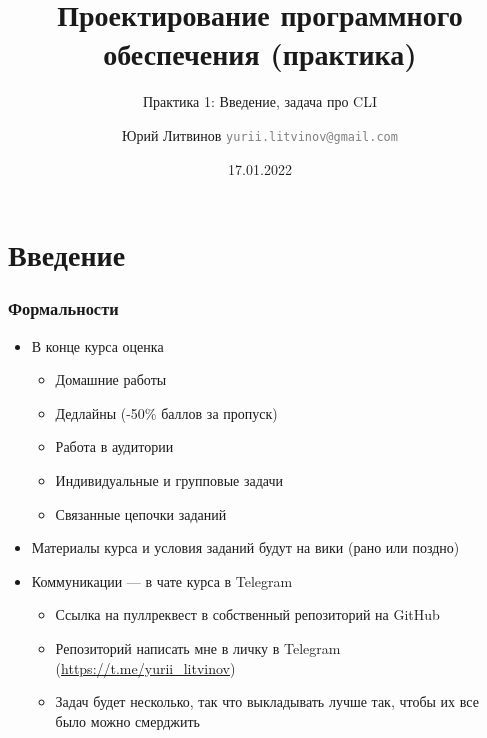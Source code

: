 \documentclass[xetex,mathserif,serif]{beamer}
\title{Проектирование программного обеспечения (практика)}
\subtitle{Практика 1: Введение, задача про CLI}
\author[Юрий Литвинов]{Юрий Литвинов \newline \textcolor{gray}{\small\texttt{yurii.litvinov@gmail.com}}}
\date{17.01.2022}
\begin{document}
    
    \frame{\titlepage}

    \section{Введение}
    
    \begin{frame}
        \frametitle{Формальности}
        \begin{itemize}
            \item В конце курса оценка
            \begin{itemize}
                \item Домашние работы
                \item Дедлайны (-50\% баллов за пропуск)
                \item Работа в аудитории
                \item Индивидуальные и групповые задачи
                \item Связанные цепочки заданий
            \end{itemize}
            \item Материалы курса и условия заданий будут на вики (рано или  поздно)
            \item Коммуникации --- в чате курса в Telegram
            \begin{itemize}
                \item Ссылка на пуллреквест в собственный репозиторий на GitHub
                \item Репозиторий написать мне в личку в Telegram (\url{https://t.me/yurii_litvinov})
                \item Задач будет несколько, так что выкладывать лучше так, чтобы их все было можно смерджить
            \end{itemize}
        \end{itemize}
    \end{frame}
\end{document}
